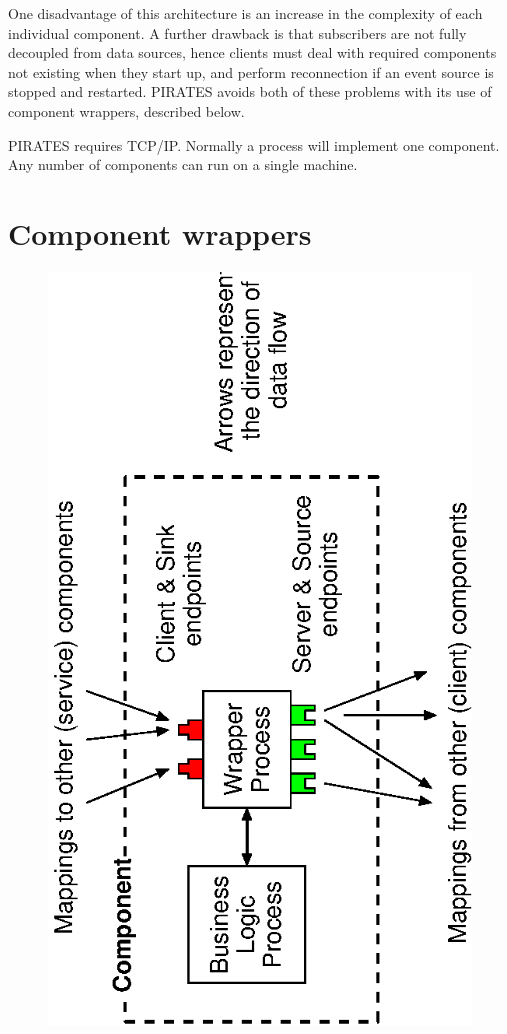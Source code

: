 \documentclass[12pt,a4paper,twoside]{article}
\renewcommand{\_}{\texttt{\symbol{95}}}
\begin{document}
One disadvantage of this architecture is an increase in the complexity
of each individual component. A further drawback is that subscribers
are not fully decoupled from data sources, hence clients must deal with
required components not existing when they start up, and perform
reconnection if an event source is stopped and restarted. PIRATES avoids
both of these problems with its use of component wrappers,
described below.

PIRATES requires TCP/IP. Normally a process will implement one
component. Any number of components can run on a single machine.

\section{Component wrappers}

\begin{figure}[h]
\centering
\includegraphics[scale=1.0,angle=-90]{diagrams/parts.eps}
\end{figure}
\end{document}
